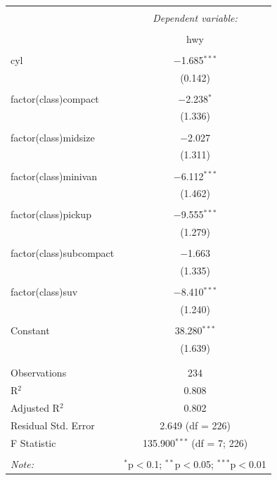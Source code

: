 \documentclass[12pt,]{article}
\begin{document}
\begin{table}[!htbp] \centering 
  \caption{} 
  \label{} 
\begin{tabular}{@{\extracolsep{5pt}}lc} 
\\[-1.8ex]\hline 
\hline \\[-1.8ex] 
 & \multicolumn{1}{c}{\textit{Dependent variable:}} \\ 
\cline{2-2} 
\\[-1.8ex] & hwy \\ 
\hline \\[-1.8ex] 
 cyl & $-$1.685$^{***}$ \\ 
  & (0.142) \\ 
  & \\ 
 factor(class)compact & $-$2.238$^{*}$ \\ 
  & (1.336) \\ 
  & \\ 
 factor(class)midsize & $-$2.027 \\ 
  & (1.311) \\ 
  & \\ 
 factor(class)minivan & $-$6.112$^{***}$ \\ 
  & (1.462) \\ 
  & \\ 
 factor(class)pickup & $-$9.555$^{***}$ \\ 
  & (1.279) \\ 
  & \\ 
 factor(class)subcompact & $-$1.663 \\ 
  & (1.335) \\ 
  & \\ 
 factor(class)suv & $-$8.410$^{***}$ \\ 
  & (1.240) \\ 
  & \\ 
 Constant & 38.280$^{***}$ \\ 
  & (1.639) \\ 
  & \\ 
\hline \\[-1.8ex] 
Observations & 234 \\ 
R$^{2}$ & 0.808 \\ 
Adjusted R$^{2}$ & 0.802 \\ 
Residual Std. Error & 2.649 (df = 226) \\ 
F Statistic & 135.900$^{***}$ (df = 7; 226) \\ 
\hline 
\hline \\[-1.8ex] 
\textit{Note:}  & \multicolumn{1}{r}{$^{*}$p$<$0.1; $^{**}$p$<$0.05; $^{***}$p$<$0.01} \\ 
\end{tabular} 
\end{table}
\end{document}
